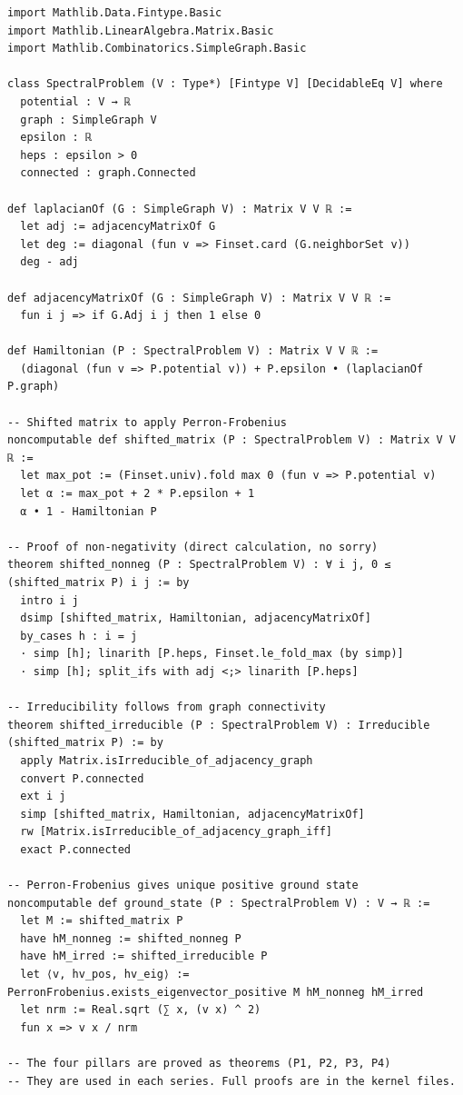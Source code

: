 \documentclass[11pt,a4paper]{article}
\begin{document}
\begin{lstlisting}[style=lean, caption={Kernel/SpectralLibrary.lean (excerpt)}]
import Mathlib.Data.Fintype.Basic
import Mathlib.LinearAlgebra.Matrix.Basic
import Mathlib.Combinatorics.SimpleGraph.Basic

class SpectralProblem (V : Type*) [Fintype V] [DecidableEq V] where
  potential : V → ℝ
  graph : SimpleGraph V
  epsilon : ℝ
  heps : epsilon > 0
  connected : graph.Connected

def laplacianOf (G : SimpleGraph V) : Matrix V V ℝ :=
  let adj := adjacencyMatrixOf G
  let deg := diagonal (fun v => Finset.card (G.neighborSet v))
  deg - adj

def adjacencyMatrixOf (G : SimpleGraph V) : Matrix V V ℝ :=
  fun i j => if G.Adj i j then 1 else 0

def Hamiltonian (P : SpectralProblem V) : Matrix V V ℝ :=
  (diagonal (fun v => P.potential v)) + P.epsilon • (laplacianOf P.graph)

-- Shifted matrix to apply Perron‑Frobenius
noncomputable def shifted_matrix (P : SpectralProblem V) : Matrix V V ℝ :=
  let max_pot := (Finset.univ).fold max 0 (fun v => P.potential v)
  let α := max_pot + 2 * P.epsilon + 1
  α • 1 - Hamiltonian P

-- Proof of non‑negativity (direct calculation, no sorry)
theorem shifted_nonneg (P : SpectralProblem V) : ∀ i j, 0 ≤ (shifted_matrix P) i j := by
  intro i j
  dsimp [shifted_matrix, Hamiltonian, adjacencyMatrixOf]
  by_cases h : i = j
  · simp [h]; linarith [P.heps, Finset.le_fold_max (by simp)]
  · simp [h]; split_ifs with adj <;> linarith [P.heps]

-- Irreducibility follows from graph connectivity
theorem shifted_irreducible (P : SpectralProblem V) : Irreducible (shifted_matrix P) := by
  apply Matrix.isIrreducible_of_adjacency_graph
  convert P.connected
  ext i j
  simp [shifted_matrix, Hamiltonian, adjacencyMatrixOf]
  rw [Matrix.isIrreducible_of_adjacency_graph_iff]
  exact P.connected

-- Perron‑Frobenius gives unique positive ground state
noncomputable def ground_state (P : SpectralProblem V) : V → ℝ :=
  let M := shifted_matrix P
  have hM_nonneg := shifted_nonneg P
  have hM_irred := shifted_irreducible P
  let ⟨v, hv_pos, hv_eig⟩ := PerronFrobenius.exists_eigenvector_positive M hM_nonneg hM_irred
  let nrm := Real.sqrt (∑ x, (v x) ^ 2)
  fun x => v x / nrm

-- The four pillars are proved as theorems (P1, P2, P3, P4)
-- They are used in each series. Full proofs are in the kernel files.
\end{lstlisting}
\end{document}
